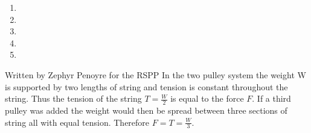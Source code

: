 
\begin{problem}
{
\nl
{}
\begin{enumerate}
\item {}
\item {}
\item {}
\item {}
\item {}
\end{enumerate}
}
{Written by Zephyr Penoyre for the RSPP}
{
 In the two pulley system the weight W is supported by two lengths of string and tension is constant throughout the string. Thus the tension of the string $T = \frac{W}{2}$ is equal to the force $F$. If a third pulley was added the weight would then be spread between three sections of string all with equal tension.
Therefore $F = T = \frac{W}{3}$.
}
\end{problem}